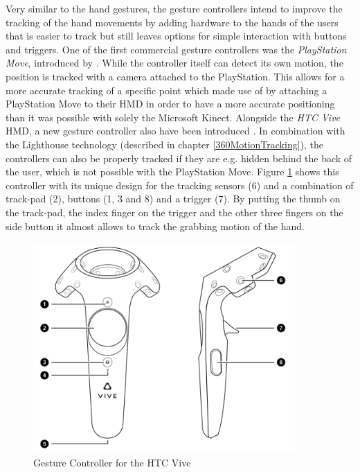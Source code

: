 Very similar to the hand gestures, the gesture controllers intend to improve the tracking of the hand movements by adding hardware to the hands of the users that is easier to track but still leaves options for simple interaction with buttons and triggers. \newline
One of the first commercial gesture controllers was the \textit{PlayStation Move}, introduced by \cite{Sony2010}. While the controller itself can detect its own motion, the position is tracked with a camera attached to the PlayStation. This allows for a more accurate tracking of a specific point which \cite{Takala2014} made use of by attaching a PlayStation Move to their HMD in order to have a more accurate positioning than it was possible with solely the Microsoft Kinect. \newline
Alongside the \textit{HTC Vive} HMD, a new gesture controller also have been introduced \citep{Htcvive2016}. In combination with the Lighthouse technology (described in chapter \ref{360MotionTracking}), the controllers can also be properly tracked if they are e.g. hidden behind the back of the user, which is not possible with the PlayStation Move. Figure \ref{fig:gesturecontroller} shows this controller with its unique design for the tracking sensors (6) and a combination of track-pad (2), buttons (1, 3 and 8) and a trigger (7). By putting the thumb on the track-pad, the index finger on the trigger and the other three fingers on the side button it almost allows to track the grabbing motion of the hand.
\begin{figure}[h]
	\begin{center}
		\includegraphics[width=10cm]{03_Figures/05_LitReview/HTCCorp2016_GestureController.png}
		\caption[Gesture Controller for the HTC Vive]{Gesture Controller for the HTC Vive \citep{HTCCorp2016}}
		\label{fig:gesturecontroller}
	\end{center}
\end{figure}


